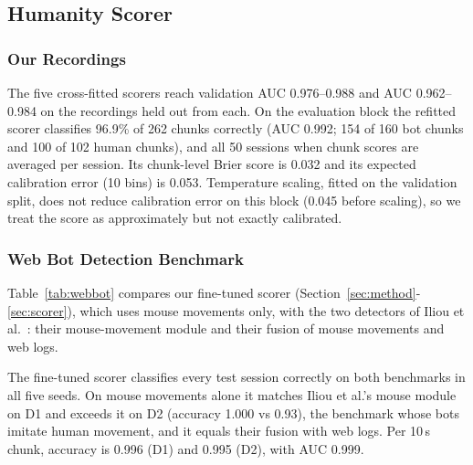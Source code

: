 \documentclass{ieeetj}
\begin{document}
\subsection{Humanity Scorer}
\label{sec:res_scorer}
\subsubsection{Our Recordings}
The five cross-fitted scorers reach validation AUC 0.976--0.988 and AUC 0.962--0.984 on the recordings held out from each. 
On the evaluation block the refitted scorer classifies 96.9\% of 262 chunks correctly (AUC 0.992; 154 of 160 bot chunks and 100 of 102 human chunks), and all 50 sessions when chunk scores are averaged per session. 
Its chunk-level Brier score is 0.032 and its expected calibration error (10 bins) is 0.053. 
Temperature scaling, fitted on the validation split, does not reduce calibration error on this block (0.045 before scaling), so we treat the score as approximately but not exactly calibrated. 

\vspace{-15pt}
\subsubsection{Web Bot Detection Benchmark}
Table~\ref{tab:webbot} compares our fine-tuned scorer (Section~\ref{sec:method}-\ref{sec:scorer}), which uses mouse movements only, with the two detectors of Iliou et al.\ \cite{iliou_2021}: their mouse-movement module and their fusion of mouse movements and web logs.

The fine-tuned scorer classifies every test session correctly on both benchmarks in all five seeds. 
On mouse movements alone it matches Iliou et al.'s mouse module on D1 and exceeds it on D2 (accuracy 1.000 vs 0.93), the benchmark whose bots imitate human movement, and it equals their fusion with web logs. 
Per 10\,s chunk, accuracy is 0.996 (D1) and 0.995 (D2), with AUC 0.999.
\end{document}
